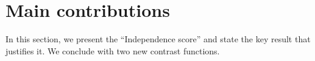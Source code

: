 \documentclass[letterpaper]{article}
\newcommand{\rd}{\color{red}}
\begin{document}
\section{Main contributions}
\label{section:main_results}
In this section, we present the ``Independence score'' and state the key result that justifies it. We conclude with two new contrast functions. 
\end{document}
